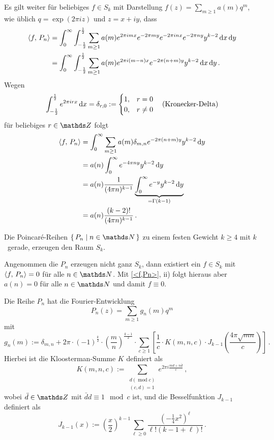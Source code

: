 \begin{bewe-list}
Es gilt weiter für beliebiges $f \in S_k$ mit Darstellung $f(z) = \sum_{m \geq 1} a(m)q^m$, wie üblich $q = \exp(2\pi iz)$ und $z = x + iy$, dass
\begin{align*}
	\scalarprd {f}{P_n} &= \int_0^\infty \int_{-\frac 12}^{\frac 12} \sum_{m \geq 1} a(m) e^{2 \pi imx}e^{-2\pi my}e^{-2\pi inx}e^{-2\pi ny}y^{k-2} \opd x \opd y\\
	&= \int_0^\infty \int_{-\frac 12}^{\frac 12} \sum_{m \geq 1} a(m) e^{2 \pi i(m-n)x}e^{-2\pi (n+m)y}y^{k-2} \opd x \opd y\,.
\end{align*}
Wegen 
\[
	\int_{- \frac 12}^{\frac 12} e^{2 \pi irx} \,\mathrm{d} x = \delta_{r,0} := \begin{cases}1, & r = 0\\0, & r \neq 0\end{cases} \quad \text{(Kronecker-Delta)}
\]
für beliebiges $r \in \ZZ$ folgt
\begin{align*}
	\scalarprd {f}{P_n} &= \int_0^\infty \sum_{m \geq 1} a(m) \delta_{m,n} e^{-2\pi (n+m)y}y^{k-2} \opd y \\
	&= a(n) \int_0^\infty e^{-4\pi ny} y^{k-2} \opd y \\
	&= a(n) \frac{1}{(4\pi n)^{k-1}} \underbrace{\int_0^\infty e^{-y} y^{k-2} \opd y}_{= \Gamma(k-1)} \\
	&= a(n) \frac{(k-2)!}{(4\pi n)^{k-1}}
	\,.
\end{align*}
\end{bewe-list}

\begin{koro}
Die Poincaré-Reihen $\Set{ P_n \mid n \in \NN}$ zu einem festen Gewicht $k \geq 4$ mit $k$~gerade, erzeugen den Raum $S_k$.
\end{koro}

\begin{bewe}
Angenommen die $P_n$ erzeugen nicht ganz $S_k$, dann existiert ein $f \in S_k$ mit $\scalarprd {f}{P_n} = 0$ für alle $n \in \NN$. Mit \autoref{<f,Pn>}, ii) folgt hieraus aber $a(n) = 0$ für alle $n \in \NN$ und damit $f \equiv 0$.
\end{bewe}

\begin{satz}
Die Reihe $P_n$ hat die Fourier-Entwicklung
\[
	P_n(z) = \sum_{m \geq 1} g_n(m) q^m
\]
mit
\[
	g_n(m) := \delta_{m,n} + 2\pi \cdot (-1)^{\frac k2} \cdot \left(\frac mn\right)^{\frac {k-1}2} \cdot \sum_{c \geq 1} \left[ \frac 1c \cdot K(m,n,c) \cdot J_{k-1}\left(\frac{4\pi \sqrt{mn}}c\right) \right]
	\,.
\]
Hierbei ist die Kloosterman-Summe $K$ definiert als
\[
	K(m,n,c) := \sum_{\substack{d (\operatorname{mod} c) \\ (c,d)=1}} e^{2\pi i \frac{md + n\bar{d}}{c}}
	\,,
\]
wobei $\bar d \in \ZZ$ mit $\bar d d \equiv 1 \mod c$ ist, und die Besselfunktion $J_{k-1}$ definiert als
\[
	J_{k-1}(x) := \left(\frac x2\right)^{k-1} \sum_{\ell \geq 0} \frac{(-\frac 14 x^2)^\ell}{\ell! (k-1+\ell)!}
	\,.
\]
\end{satz}

